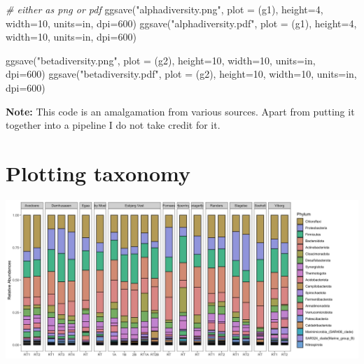 \documentclass[
]{book}
\newenvironment{Shaded}{\begin{snugshade}}{\end{snugshade}}
\newcommand{\AttributeTok}[1]{\textcolor[rgb]{0.77,0.63,0.00}{#1}}
\newcommand{\CommentTok}[1]{\textcolor[rgb]{0.56,0.35,0.01}{\textit{#1}}}
\newcommand{\DecValTok}[1]{\textcolor[rgb]{0.00,0.00,0.81}{#1}}
\newcommand{\FunctionTok}[1]{\textcolor[rgb]{0.00,0.00,0.00}{#1}}
\newcommand{\NormalTok}[1]{#1}
\newcommand{\StringTok}[1]{\textcolor[rgb]{0.31,0.60,0.02}{#1}}
\begin{document}
\begin{Shaded}
\begin{Highlighting}[]
\CommentTok{\# either as png or pdf}
\FunctionTok{ggsave}\NormalTok{(}\StringTok{"alphadiversity.png"}\NormalTok{, }\AttributeTok{plot =}\NormalTok{ (g1), }\AttributeTok{height=}\DecValTok{4}\NormalTok{, }\AttributeTok{width=}\DecValTok{10}\NormalTok{, }\AttributeTok{units=}\StringTok{\textquotesingle{}in\textquotesingle{}}\NormalTok{, }\AttributeTok{dpi=}\DecValTok{600}\NormalTok{)}
\FunctionTok{ggsave}\NormalTok{(}\StringTok{"alphadiversity.pdf"}\NormalTok{, }\AttributeTok{plot =}\NormalTok{ (g1), }\AttributeTok{height=}\DecValTok{4}\NormalTok{, }\AttributeTok{width=}\DecValTok{10}\NormalTok{, }\AttributeTok{units=}\StringTok{\textquotesingle{}in\textquotesingle{}}\NormalTok{, }\AttributeTok{dpi=}\DecValTok{600}\NormalTok{)}

\FunctionTok{ggsave}\NormalTok{(}\StringTok{"betadiversity.png"}\NormalTok{, }\AttributeTok{plot =}\NormalTok{ (g2), }\AttributeTok{height=}\DecValTok{10}\NormalTok{, }\AttributeTok{width=}\DecValTok{10}\NormalTok{, }\AttributeTok{units=}\StringTok{\textquotesingle{}in\textquotesingle{}}\NormalTok{, }\AttributeTok{dpi=}\DecValTok{600}\NormalTok{)}
\FunctionTok{ggsave}\NormalTok{(}\StringTok{"betadiversity.pdf"}\NormalTok{, }\AttributeTok{plot =}\NormalTok{ (g2), }\AttributeTok{height=}\DecValTok{10}\NormalTok{, }\AttributeTok{width=}\DecValTok{10}\NormalTok{, }\AttributeTok{units=}\StringTok{\textquotesingle{}in\textquotesingle{}}\NormalTok{, }\AttributeTok{dpi=}\DecValTok{600}\NormalTok{)}
\end{Highlighting}
\end{Shaded}

\textbf{Note:}
This code is an amalgamation from various sources. Apart from putting it together into a pipeline I do not take credit for it.

\hypertarget{plottingtaxa}{%
\chapter{Plotting taxonomy}\label{plottingtaxa}}

\includegraphics{./img/phylumplot.png}
\end{document}
